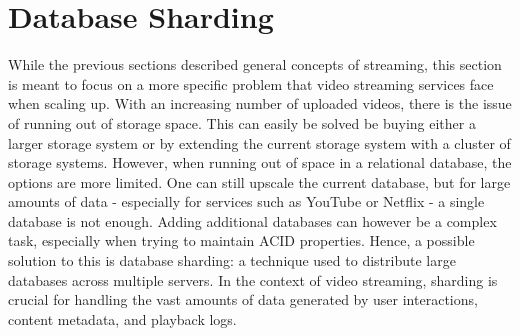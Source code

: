 \begin{table}[h]
    \centering
    \caption{Comparison of In-House Storage, Cloud Storage, and P2P for Video Streaming}
    \label{tab:comparison_storage_delivery}
\end{table}

\section{Database Sharding}\label{section:db-sharding}
While the previous sections described general concepts of streaming, this section is meant to focus on a more specific problem that video streaming services face when scaling up. 
With an increasing number of uploaded videos, there is the issue of running out of storage space. This can easily be solved be buying either a larger storage system or by extending the current storage system with a cluster of storage systems. However, when running out of space in a relational database, the options are more limited. One can still upscale the current database, but for large amounts of data - especially for services such as YouTube or Netflix - a single database is not enough. Adding additional databases can however be a complex task, especially when trying to maintain \ac{ACID} properties. 
Hence, a possible solution to this is database sharding: a technique used to distribute large databases across multiple servers. In the context of video streaming, sharding is crucial for handling the vast amounts of data generated by user interactions, content metadata, and playback logs.

